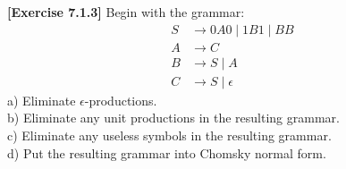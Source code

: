 \textbf{[Exercise 7.1.3]} Begin with the grammar:
\begin{align*}
    S &\rightarrow 0A0 \mid 1B1 \mid BB\\
    A &\rightarrow C\\
    B &\rightarrow S \mid A\\
    C &\rightarrow S \mid \epsilon
\end{align*}
a) Eliminate $\epsilon$-productions.\\
b) Eliminate any unit productions in the resulting grammar.\\
c) Eliminate any useless symbols in the resulting grammar.\\
d) Put the resulting grammar into Chomsky normal form.